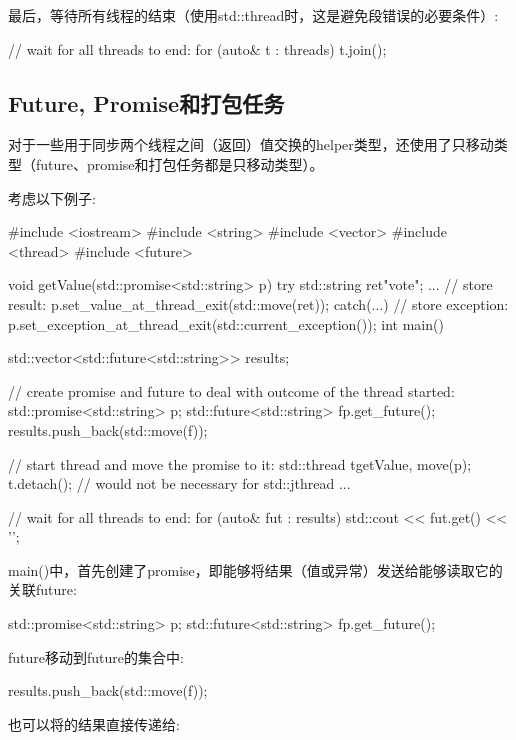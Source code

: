最后，等待所有线程的结束（使用std::thread时，这是避免段错误的必要条件）:

\begin{cppcode}
// wait for all threads to end:
for (auto& t : threads) {
	t.join();
}
\end{cppcode}

\subsection{Future, Promise和打包任务}

对于一些用于同步两个线程之间（返回）值交换的helper类型，还使用了只移动类型（future、promise和打包任务都是只移动类型）。

考虑以下例子:

\begin{cppcode}
#include <iostream>
#include <string>
#include <vector>
#include <thread>
#include <future>

void getValue(std::promise<std::string> p)
{
	try {
		std::string ret{"vote"};
		...
		// store result:
		p.set_value_at_thread_exit(std::move(ret));
	}
	catch(...) {
		// store exception:
		p.set_exception_at_thread_exit(std::current_exception());
	}
}
int main()
{
	std::vector<std::future<std::string>> results;

	// create promise and future to deal with outcome of the thread started:
	std::promise<std::string> p;
	std::future<std::string> f{p.get_future()};
	results.push_back(std::move(f));

	// start thread and move the promise to it:
	std::thread t{getValue, move(p)};
	t.detach(); // would not be necessary for std::jthread
	...

	// wait for all threads to end:
	for (auto& fut : results) {
		std::cout << fut.get() << '\n';
	}
}
\end{cppcode}

main()中，首先创建了promise，即能够将结果（值或异常）发送给能够读取它的关联future:

\begin{cppcode}
std::promise<std::string> p;
std::future<std::string> f{p.get_future()};
\end{cppcode}

future移动到future的集合中:

\begin{cppcode}
results.push_back(std::move(f));
\end{cppcode}

也可以将的结果直接传递给:

